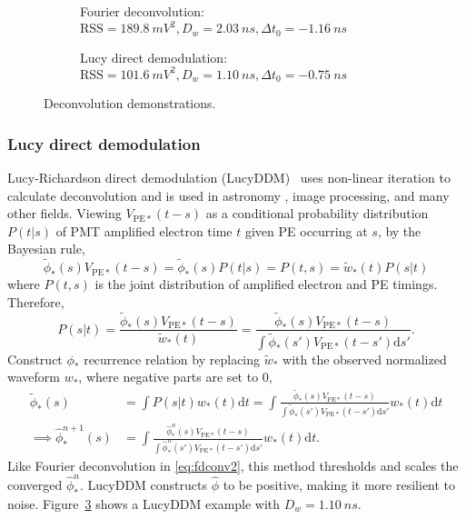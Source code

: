 \begin{figure}[H]
  \begin{subfigure}{0.5\textwidth}
    \centering
    \scalebox{0.36}{}
    \caption{\label{fig:fd}Fourier deconvolution: $\mathrm{RSS}=\SI{189.8}{mV^2},D_w=\SI{2.03}{ns},\Delta t_0=\SI{-1.16}{ns}$}
  \end{subfigure}
  \begin{subfigure}{0.5\textwidth}
    \centering
    \scalebox{0.36}{}
    \caption{\label{fig:lucy}Lucy direct demodulation: $\mathrm{RSS}=\SI{101.6}{mV^2},D_w=\SI{1.10}{ns},\Delta t_0=\SI{-0.75}{ns}$}
  \end{subfigure}
  \caption{Deconvolution demonstrations.}
\end{figure}

\subsubsection{Lucy direct demodulation}

Lucy-Richardson direct demodulation (LucyDDM)~\cite{lucy_iterative_1974} uses non-linear iteration to calculate deconvolution and is used in astronomy \cite{li_richardson-lucy_2019}, image processing, and many other fields.  Viewing $V_{\mathrm{PE}*}(t-s)$ as a conditional probability distribution $P(t|s)$ of PMT amplified electron time $t$ given PE occurring at $s$, by the Bayesian rule,
\begin{equation}
  \label{eq:lucy}
  \tilde{\phi}_*(s) V_{\mathrm{PE}*}(t-s) = \tilde{\phi}_*(s)P(t|s) = P(t,s) = \tilde{w}_*(t)P(s|t)
\end{equation}
where $P(t,s)$ is the joint distribution of amplified electron and PE timings.  Therefore,
\begin{equation}
  \label{eq:ptt}
  P(s|t) = \frac{\tilde{\phi}_*(s) V_{\mathrm{PE}*}(t-s)}{\tilde{w}_*(t)} = \frac{\tilde{\phi}_*(s) V_{\mathrm{PE}*}(t-s)}{\int\tilde{\phi}_*(s') V_{\mathrm{PE}*}(t-s')\mathrm{d}s'}.
\end{equation}
Construct $\phi_*$ recurrence relation by replacing $\tilde{w}_*$ with the observed normalized waveform $w_*$, where negative parts are set to 0,
\begin{equation}
  \label{eq:iter}
  \begin{aligned}
    \tilde{\phi}_*(s) & = \int P(s|t) w_*(t)\mathrm{d}t =  \int \frac{\tilde{\phi}_*(s) V_{\mathrm{PE}*}(t-s)}{\int\tilde{\phi}_*(s') V_{\mathrm{PE}*}(t-s')\mathrm{d}s'} w_*(t) \mathrm{d}t \\
    \implies \hat{\phi}_*^{n+1}(s) & = \int \frac{\hat{\phi}_*^n(s) V_{\mathrm{PE}*}(t-s)}{\int\hat{\phi}_*^n(s') V_{\mathrm{PE}*}(t-s')\mathrm{d}s'} w_*(t) \mathrm{d}t.
  \end{aligned}
\end{equation}
Like Fourier deconvolution in \eqref{eq:fdconv2}, this method thresholds and scales the converged $\hat{\phi}_*^{n}$. LucyDDM constructs $\hat{\phi}$ to be positive, making it more resilient to noise.  Figure~\ref{fig:lucy} shows a LucyDDM example with $D_w = \SI{1.10}{ns}$.

